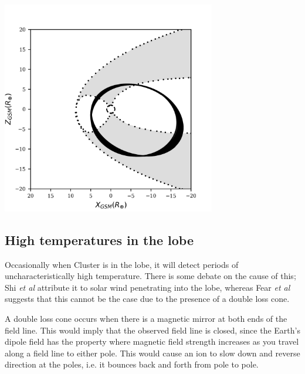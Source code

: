 \documentclass[12pt]{article}
\newenvironment{Figure}
  {\par\medskip\noindent\minipage{\linewidth}}
  {\endminipage\par\medskip}
\begin{document}
\begin{Figure}
    \begin{minipage}[c]{0.57\textwidth}
        \centering
        \includegraphics[width=0.7\textwidth]{sc_pos_09_05_coloured.png}
    \end{minipage}\hfill
    \begin{minipage}[c]{0.4\textwidth}
        \label{fig:ClusterPos}
    \end{minipage}
\end{Figure}

\subsection{High temperatures in the lobe}
Occasionally when Cluster is in the lobe, it will detect periods of uncharacteristically high temperature. There is some debate on the cause of this; Shi \textit{et al} \cite{Shi2013} attribute it to solar wind penetrating into the lobe, whereas Fear \textit{et al} \cite{Fear1506} suggests that this cannot be the case due to the presence of a double loss cone. 

A double loss cone occurs when there is a magnetic mirror at both ends of the field line. This would imply that the observed field line is closed, since the Earth's dipole field has the property where magnetic field strength increases as you travel along a field line to either pole. This would cause an ion to slow down and reverse direction at the poles, i.e. it bounces back and forth from pole to pole.
\end{document}
